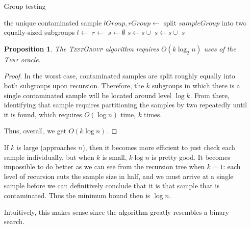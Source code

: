 \documentclass{article}
\newtheorem{proposition}{Proposition}
\begin{document}
\begin{algorithm}[H]
    \caption{Group testing}
    \begin{algorithmic}
                \Return the unique contaminated sample
            \EndIf
            \State $lGroup, rGroup \gets$ split $sampleGroup$ into two equally-sized subgroups
            \State $l \gets$ 
            \State $r \gets$ 
            \State $s \gets \emptyset$
                \State $s \gets s \cup$ 
            \EndIf
                \State $s \gets s \cup$ 
            \EndIf
            \State \Return $s$
        \EndFunction
    \end{algorithmic}
\end{algorithm}

\begin{proposition}
    The \textsc{TestGroup} algorithm requires $O(k\log_2{n})$ uses of the \textsc{Test} oracle.
\end{proposition}

\begin{proof}
    In the worst case, contaminated samples are split roughly equally into both
    subgroups upon recursion. Therefore, the $k$ subgroups in which there is a
    single contaminated sample will be located around level $\log k$. From
    there, identifying that sample requires partitioning the samples by two
    repeatedly until it is found, which requires $O(\log n)$ time, $k$ times.

    Thus, overall, we get $O(k \log n)$.
\end{proof}

If $k$ is large (approaches $n$), then it becomes more efficient to just
check each sample individually, but when $k$ is small, $k \log n$ is pretty
good. It becomes impossible to do better as we can see from the recursion tree
when $k=1$: each level of recursion cuts the sample size in half, and we must
arrive at a single sample before we can definitively conclude that it is that
sample that is contaminated. Thus the minimum bound then is $\log n$.

Intuitively, this makes sense since the algorithm greatly resembles a binary
search.
\end{document}
